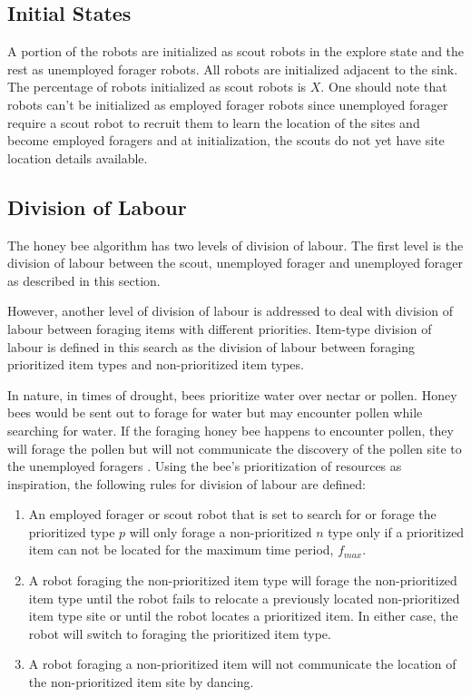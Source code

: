 \subsection{Initial States}

A portion of the robots are initialized as scout robots in the explore state and the rest as unemployed forager robots. All robots are initialized adjacent to the sink. The percentage of robots initialized as scout robots is $X$. One should note that robots can't be initialized as employed forager robots since unemployed forager require a scout robot to recruit them to learn the location of the sites and become employed foragers and at initialization, the scouts do not yet have site location details available.

\subsection{Division of Labour}
The honey bee algorithm has two levels of division of labour. The first level is the division of labour between the scout, unemployed forager and unemployed forager as described in this section.

However, another level of division of labour is addressed to deal with division of labour between foraging items with different priorities. Item-type division of labour is defined in this search as the division of labour between foraging prioritized item types and non-prioritized item types.

In nature, in times of drought, bees prioritize water over nectar or pollen. Honey bees would be sent out to forage for water but may encounter pollen while searching for water. If the foraging honey bee happens to encounter pollen, they will forage the pollen but will not communicate the discovery of the pollen site to the unemployed foragers  \cite{seeley2009wisdom}. Using the bee's prioritization of resources as inspiration, the following rules for division of labour are defined:

\begin{enumerate}
\item An employed forager or scout robot that is set to search for or forage the prioritized type $p$ will only forage a non-prioritized $n$ type only if a prioritized item can not be located for the maximum time period, $f_{max}$.
\item A robot foraging the non-prioritized item type will forage the non-prioritized item type until the robot fails to relocate a previously located non-prioritized item type site or until the robot locates a prioritized item. In either case, the robot will switch to foraging the prioritized item type.
\item A robot foraging a non-prioritized item will not communicate the location of the non-prioritized item site by dancing. 
\end{enumerate}

